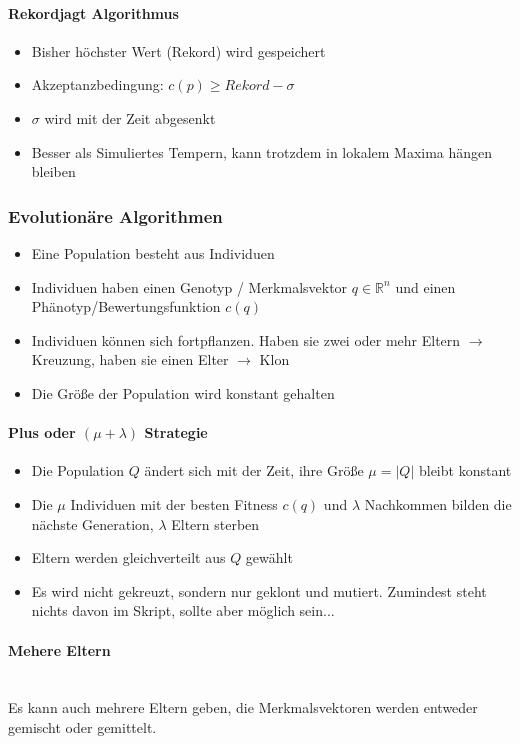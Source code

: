 \paragraph{Rekordjagt Algorithmus}
\begin{itemize}
	\item Bisher höchster Wert (Rekord) wird gespeichert
	\item Akzeptanzbedingung: \(c(p) \geq Rekord - \sigma\)
	\item \(\sigma\) wird mit der Zeit abgesenkt
	\item Besser als Simuliertes Tempern, kann trotzdem in lokalem Maxima hängen bleiben
\end{itemize}

\subsubsection{Evolutionäre Algorithmen}
\begin{itemize}
	\item Eine Population besteht aus Individuen
	\item Individuen haben einen Genotyp / Merkmalsvektor \(q \in \mathbb{R}^n\) und einen Phänotyp/Bewertungsfunktion \(c(q)\)
	\item Individuen können sich fortpflanzen. Haben sie zwei oder mehr Eltern $\rightarrow$ Kreuzung, haben sie einen Elter $\rightarrow$ Klon
	\item Die Größe der Population wird konstant gehalten
\end{itemize}

\paragraph{Plus oder $(\mu + \lambda)$ Strategie}
\begin{itemize}
	\item Die Population \(Q\) ändert sich mit der Zeit, ihre Größe \(\mu = |Q|\) bleibt konstant
	\item Die \(\mu\) Individuen mit der besten Fitness \(c(q)\) und \(\lambda\) Nachkommen bilden die nächste Generation, \(\lambda\) Eltern sterben
	\item Eltern werden gleichverteilt aus \(Q\) gewählt
	\item Es wird nicht gekreuzt, sondern nur geklont und mutiert. Zumindest steht nichts davon im Skript, sollte aber möglich sein...
\end{itemize}

\paragraph{Mehere Eltern}
\text{ }\\Es kann auch mehrere Eltern geben, die Merkmalsvektoren werden entweder gemischt oder gemittelt.


